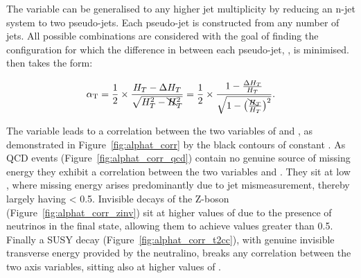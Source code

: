 The \alphat variable can be generalised to any higher jet multiplicity by reducing an n-jet
system to two pseudo-jets. Each pseudo-jet is constructed from any number of jets.
All possible combinations are considered with the goal of finding the configuration
for which the difference in \HT between each pseudo-jet, \deltaHT, is minimised.
\alphat then takes the form:

% 
\begin{equation}
\alpha_{\text{T}} = \frac{1}{2} \times \frac{H_T-\Delta H_T}{\sqrt{H_T^2 - \bcancel{H}_T^2}} = 
\frac{1}{2} \times \frac{1-\frac{\Delta H_T}{H_T}}{\sqrt{1 - \big(\frac{\bcancel{H}_T}
{H_T}\big)^2}}.
\label{eq:alphat_njet}
\end{equation}
% 

The \alphat variable leads to a correlation between the two variables of \mht
and \deltaHT, as demonstrated in Figure~\ref{fig:alphat_corr} by the black contours of
constant \alphat. 
As QCD events (Figure~\ref{fig:alphat_corr_qcd}) contain no genuine source of missing
energy they exhibit a correlation between the two variables \mht and \deltaHT. They
sit at low \mht, where missing energy arises predominantly due to jet
mismeasurement, thereby largely having \alphat < 0.5. Invisible decays of the Z-boson
(Figure~\ref{fig:alphat_corr_zinv}) sit at higher values of \mht due to the
presence of neutrinos in the final state, allowing them to achieve \alphat values
greater than 0.5. Finally a SUSY decay (Figure~\ref{fig:alphat_corr_t2cc}), with
genuine invisible transverse energy provided by the neutralino, breaks any correlation
between the two axis variables, sitting also at higher values of \alphat.

